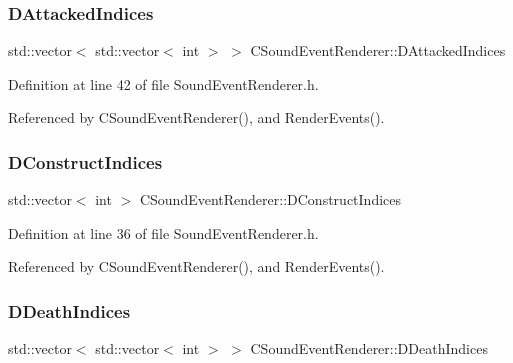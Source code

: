 \hypertarget{classCSoundEventRenderer_a5ffc7dd4911c09c23987c6d1a8776c26}{}\label{classCSoundEventRenderer_a5ffc7dd4911c09c23987c6d1a8776c26} 
\subsubsection{\texorpdfstring{D\+Attacked\+Indices}{DAttackedIndices}}
{\footnotesize\ttfamily std\+::vector$<$ std\+::vector$<$ int $>$ $>$ C\+Sound\+Event\+Renderer\+::\+D\+Attacked\+Indices\hspace{0.3cm}{\ttfamily [protected]}}



Definition at line 42 of file Sound\+Event\+Renderer.\+h.



Referenced by C\+Sound\+Event\+Renderer(), and Render\+Events().

\hypertarget{classCSoundEventRenderer_ad49edcbf2abf0ecef518c843475098e2}{}\label{classCSoundEventRenderer_ad49edcbf2abf0ecef518c843475098e2} 
\subsubsection{\texorpdfstring{D\+Construct\+Indices}{DConstructIndices}}
{\footnotesize\ttfamily std\+::vector$<$ int $>$ C\+Sound\+Event\+Renderer\+::\+D\+Construct\+Indices\hspace{0.3cm}{\ttfamily [protected]}}



Definition at line 36 of file Sound\+Event\+Renderer.\+h.



Referenced by C\+Sound\+Event\+Renderer(), and Render\+Events().

\hypertarget{classCSoundEventRenderer_a6b250e51c42870715c12ea47b99b9594}{}\label{classCSoundEventRenderer_a6b250e51c42870715c12ea47b99b9594} 
\subsubsection{\texorpdfstring{D\+Death\+Indices}{DDeathIndices}}
{\footnotesize\ttfamily std\+::vector$<$ std\+::vector$<$ int $>$ $>$ C\+Sound\+Event\+Renderer\+::\+D\+Death\+Indices\hspace{0.3cm}{\ttfamily [protected]}}



